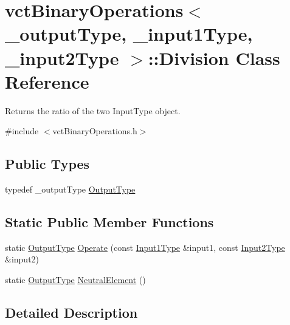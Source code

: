 \hypertarget{classvct_binary_operations_1_1_division}{}\section{vct\+Binary\+Operations$<$ \+\_\+output\+Type, \+\_\+input1\+Type, \+\_\+input2\+Type $>$\+:\+:Division Class Reference}
\label{classvct_binary_operations_1_1_division}


Returns the ratio of the two Input\+Type object.  




{\ttfamily \#include $<$vct\+Binary\+Operations.\+h$>$}

\subsection*{Public Types}
\begin{DoxyCompactItemize}
\item 
typedef \+\_\+output\+Type \hyperlink{classvct_binary_operations_1_1_division_a3e7c6d995453d18ae82265141ae1dff0}{Output\+Type}
\end{DoxyCompactItemize}
\subsection*{Static Public Member Functions}
\begin{DoxyCompactItemize}
\item 
static \hyperlink{classvct_binary_operations_1_1_division_a3e7c6d995453d18ae82265141ae1dff0}{Output\+Type} \hyperlink{classvct_binary_operations_1_1_division_acdd4e08ee584dea4dc0db6da4540b1cc}{Operate} (const \hyperlink{classvct_binary_operations_a5e56a66a012d6a28c539a08a0021c45e}{Input1\+Type} \&input1, const \hyperlink{classvct_binary_operations_a929119af557a04a16b4d854981e49e1b}{Input2\+Type} \&input2)
\item 
static \hyperlink{classvct_binary_operations_1_1_division_a3e7c6d995453d18ae82265141ae1dff0}{Output\+Type} \hyperlink{classvct_binary_operations_1_1_division_a3dbdf848ff9f642f93f5d0b7fd18fa0d}{Neutral\+Element} ()
\end{DoxyCompactItemize}


\subsection{Detailed Description}

